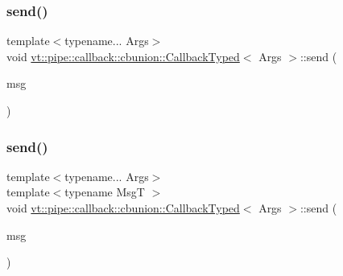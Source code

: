 \mbox{\label{structvt_1_1pipe_1_1callback_1_1cbunion_1_1_callback_typed_aa1cd1c0c5877d75e9ee3e34b910f95b5}} 
\subsubsection{\texorpdfstring{send()}{send()}\hspace{0.1cm}{\footnotesize\ttfamily [2/3]}}
{\footnotesize\ttfamily template$<$typename... Args$>$ \\
void \hyperlink{structvt_1_1pipe_1_1callback_1_1cbunion_1_1_callback_typed}{vt\+::pipe\+::callback\+::cbunion\+::\+Callback\+Typed}$<$ Args $>$\+::send (\begin{DoxyParamCaption}\item[{typename \hyperlink{structvt_1_1_c_b_traits}{C\+B\+Traits}$<$ Args... $>$\+::MsgT $\ast$}]{msg }\end{DoxyParamCaption})\hspace{0.3cm}{\ttfamily [inline]}}

\mbox{\label{structvt_1_1pipe_1_1callback_1_1cbunion_1_1_callback_typed_a241a0a2bab21374bb792873935eeba19}} 
\subsubsection{\texorpdfstring{send()}{send()}\hspace{0.1cm}{\footnotesize\ttfamily [3/3]}}
{\footnotesize\ttfamily template$<$typename... Args$>$ \\
template$<$typename MsgT $>$ \\
void \hyperlink{structvt_1_1pipe_1_1callback_1_1cbunion_1_1_callback_typed}{vt\+::pipe\+::callback\+::cbunion\+::\+Callback\+Typed}$<$ Args $>$\+::send (\begin{DoxyParamCaption}\item[{\hyperlink{structvt_1_1messaging_1_1_msg_ptr_thief}{messaging\+::\+Msg\+Ptr\+Thief}$<$ MsgT $>$}]{msg }\end{DoxyParamCaption})\hspace{0.3cm}{\ttfamily [inline]}}

